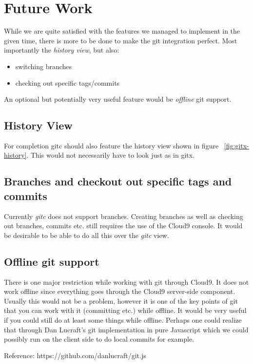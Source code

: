 \section{Future Work}
\label{sec:Future_Work}

While we are quite satisfied with the features we managed to implement in the given time,
there is more to be done to make the git integration perfect.
Most importantly the \emph{history view}, but also:
\begin{itemize}
	\item switching branches
	\item checking out specific tags/commits
\end{itemize}
An optional but potentially very useful feature would be \emph{offline} git support.

\subsection{History View}
\label{sec:history-view}

For completion gitc should also feature the history view shown in figure ~\ref{fig:gitx-history}.
This would not necessarily have to look just as in gitx.

\subsection{Branches and checkout out specific tags and commits}
\label{sec:branches}

Currently \emph{gitc} does not support branches. Creating branches as well as checking out branches,
commits etc. still requires the use of the Cloud9 console. It would be desirable to be able to do all
this over the \emph{gitc} view.

\subsection{Offline git support}
\label{sec:offline-git-support}

There is one major restriction while working with git through Cloud9. It does not work offline since everything goes through the Cloud9 server-side component.
Usually this would not be a problem, however it is one of the key points of git that you can work with it (committing etc.)
while offline.
It would be very useful if you could still do at least some things while offline.
Perhaps one could realize that through Dan Lucraft's git implementation in pure Javascript which we could possibly run on the client side to do local commits for example.

Reference: https://github.com/danlucraft/git.js
